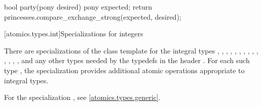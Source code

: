 \begin{itemdescr}
\begin{note}
\begin{codeblock}
bool party(pony desired) {
  pony expected;
  return princesses.compare_exchange_strong(expected, desired);
}
\end{codeblock}
\end{note}
\end{itemdescr}

[atomics.types.int]{Specializations for integers}

%
\pnum
There are specializations of the 
class template for the integral types
,
,
,
,
,
,
,
,
,
,
,
,
,
,
and any other types needed by the typedefs in the header .
For each such type , the specialization
 provides additional atomic operations appropriate to integral types.
\begin{note}
For the specialization , see \ref{atomics.types.generic}.
\end{note}

